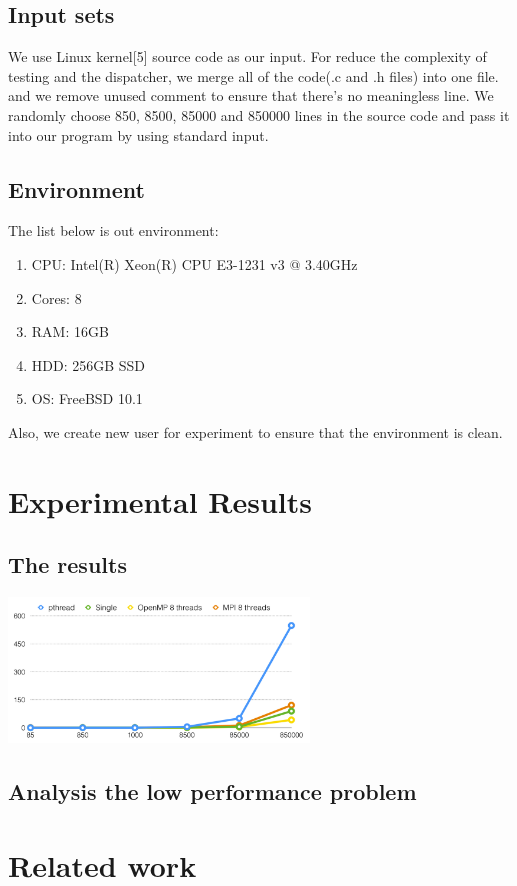 \documentclass{acm_proc_article-sp}
\begin{document}
\subsection{Input sets}
	We use Linux kernel[5] source code as our input. For reduce the complexity of testing
	and the dispatcher, we merge all of the code(.c and .h files) into one file. and we remove
	unused comment to ensure that there's no meaningless line.
	We randomly choose 850, 8500, 85000 and 850000 lines in the source code and pass
	it into our program by using standard input.
\subsection{Environment}
	The list below is out environment:
	\begin{enumerate}
		\item CPU: Intel(R) Xeon(R) CPU E3-1231 v3 @ 3.40GHz
		\item Cores: 8
		\item RAM: 16GB
		\item HDD: 256GB SSD
		\item OS: FreeBSD 10.1
	\end{enumerate}
	Also, we create new user for experiment to ensure that the environment is clean.

\section{Experimental Results}
\subsection{The results}
 \includegraphics[width=8cm]{result.png}
\subsection{Analysis the low performance problem}

	
\section{Related work}
\end{document}
